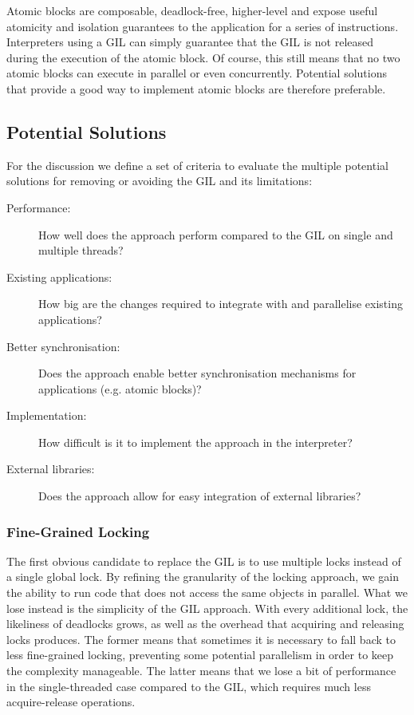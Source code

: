 \documentclass{sigplanconf}
\begin{document}
Atomic blocks are composable, deadlock-free, higher-level and expose
useful atomicity and isolation guarantees to the application for a
series of instructions.  Interpreters using a GIL can simply guarantee
that the GIL is not released during the execution of the atomic
block. Of course, this still means that no two atomic blocks can
execute in parallel or even concurrently. Potential solutions that
provide a good way to implement atomic blocks are therefore
preferable.



\subsection{Potential Solutions}

For the discussion we define a set of criteria to evaluate the
multiple potential solutions for removing or avoiding the GIL and its
limitations:

\begin{description}
\item[Performance:] How well does the approach perform compared to the
  GIL on single and multiple threads?
\item[Existing applications:] How big are the changes required to
  integrate with and parallelise existing applications?
\item[Better synchronisation:] Does the approach enable better
  synchronisation mechanisms for applications (e.g. atomic blocks)?
\item[Implementation:] How difficult is it to implement the approach
  in the interpreter?
\item[External libraries:] Does the approach allow for easy
  integration of external libraries?
\end{description}


\subsubsection{Fine-Grained Locking}

The first obvious candidate to replace the GIL is to use multiple
locks instead of a single global lock. By refining the granularity of
the locking approach, we gain the ability to run code that does not
access the same objects in parallel. What we lose instead is the
simplicity of the GIL approach. With every additional lock, the
likeliness of deadlocks grows, as well as the overhead that acquiring
and releasing locks produces. The former means that sometimes it is
necessary to fall back to less fine-grained locking, preventing some
potential parallelism in order to keep the complexity manageable.
The latter means that we lose a bit of performance in the
single-threaded case compared to the GIL, which requires much less
acquire-release operations.
\end{document}
